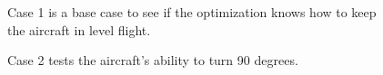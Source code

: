 \documentclass{article}
\begin{document}
\begin{figure}[htbp]
	\centering
	\qquad
	\caption{Case 1 is a base case to see if the optimization knows how to keep the aircraft in level flight.}
	\label{fig:bc}
\end{figure}


\begin{figure}[htbp]
	\centering
	\qquad
	\caption{Case 2 tests the aircraft's ability to turn 90 degrees.}
	\label{fig:commanded_dir}
\end{figure}
\end{document}
